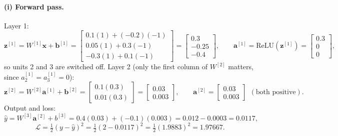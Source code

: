 \documentclass[11pt,a4paper]{article}
\begin{document}
\paragraph{(i) Forward pass.} Layer 1:
\[
\mathbf{z}^{[1]}=W^{[1]}\mathbf{x}+\mathbf{b}^{[1]}
=\begin{bmatrix}0.1(1)+(-0.2)(-1)\\0.05(1)+0.3(-1)\\-0.3(1)+0.1(-1)\end{bmatrix}
=\begin{bmatrix}0.3\\-0.25\\-0.4\end{bmatrix},
\qquad
\mathbf{a}^{[1]}=\mathrm{ReLU}(\mathbf{z}^{[1]})=\begin{bmatrix}0.3\\0\\0\end{bmatrix},
\]
so units 2 and 3 are switched off. Layer 2 (only the first column of $W^{[2]}$ matters,
since $a^{[1]}_2=a^{[1]}_3=0$):
\[
\mathbf{z}^{[2]}=W^{[2]}\mathbf{a}^{[1]}+\mathbf{b}^{[2]}
=\begin{bmatrix}0.1(0.3)\\0.01(0.3)\end{bmatrix}
=\begin{bmatrix}0.03\\0.003\end{bmatrix},
\qquad
\mathbf{a}^{[2]}=\begin{bmatrix}0.03\\0.003\end{bmatrix}\ \ (\text{both positive}).
\]
Output and loss:
\[
\hat{y}=W^{[3]}\mathbf{a}^{[2]}+b^{[3]}=0.4(0.03)+(-0.1)(0.003)=0.012-0.0003=\boxed{0.0117},
\]
\[
\mathcal{L}=\tfrac12(y-\hat{y})^2=\tfrac12(2-0.0117)^2=\tfrac12(1.9883)^2=\boxed{1.97667}.
\]
\end{document}
